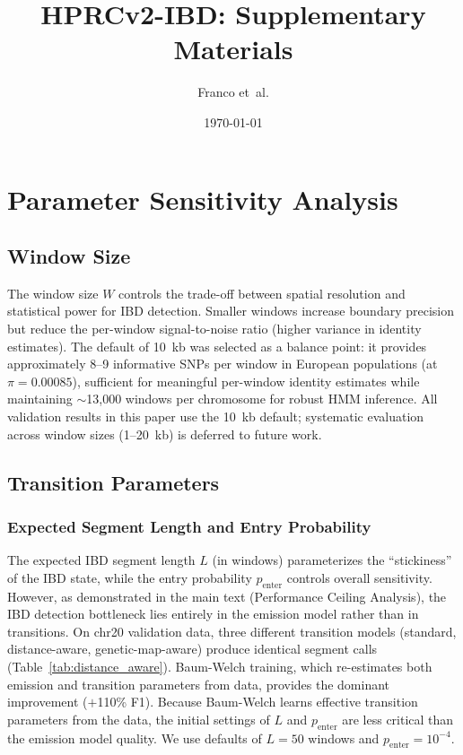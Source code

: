 \documentclass[11pt]{article}
\title{HPRCv2-IBD: Supplementary Materials}
\author{Franco et~al.}
\date{\today}
\begin{document}
\maketitle

\appendix

\section{Parameter Sensitivity Analysis}
\label{sec:supp_sensitivity}

\subsection{Window Size}

The window size $W$ controls the trade-off between spatial resolution and statistical power for IBD detection. Smaller windows increase boundary precision but reduce the per-window signal-to-noise ratio (higher variance in identity estimates). The default of 10~kb was selected as a balance point: it provides approximately 8--9 informative SNPs per window in European populations (at $\pi = 0.00085$), sufficient for meaningful per-window identity estimates while maintaining $\sim$13,000 windows per chromosome for robust HMM inference. All validation results in this paper use the 10~kb default; systematic evaluation across window sizes (1--20~kb) is deferred to future work.

\subsection{Transition Parameters}

\subsubsection{Expected Segment Length and Entry Probability}

The expected IBD segment length $L$ (in windows) parameterizes the ``stickiness'' of the IBD state, while the entry probability $p_{\text{enter}}$ controls overall sensitivity. However, as demonstrated in the main text (Performance Ceiling Analysis), the IBD detection bottleneck lies entirely in the emission model rather than in transitions. On chr20 validation data, three different transition models (standard, distance-aware, genetic-map-aware) produce identical segment calls (Table~\ref{tab:distance_aware}). Baum-Welch training, which re-estimates both emission and transition parameters from data, provides the dominant improvement ($+$110\% F1). Because Baum-Welch learns effective transition parameters from the data, the initial settings of $L$ and $p_{\text{enter}}$ are less critical than the emission model quality. We use defaults of $L = 50$ windows and $p_{\text{enter}} = 10^{-4}$.
\end{document}
